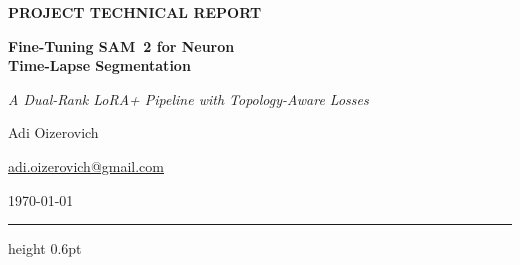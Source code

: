 \documentclass[11pt,a4paper]{article}
\begin{document}
\begin{center}
    {\small\sffamily\bfseries\color{accent}\MakeUppercase{Project Technical Report}\par}
    \vspace{0.9em}
    {\LARGE\bfseries Fine-Tuning SAM~2 for Neuron\\[2pt]
     Time-Lapse Segmentation\par}
    \vspace{0.55em}
    {\large\itshape A Dual-Rank LoRA+ Pipeline with Topology-Aware Losses\par}
    \vspace{1.1em}
    {\large Adi Oizerovich\par}
    \vspace{0.25em}
    {\small\href{mailto:adi.oizerovich@gmail.com}{adi.oizerovich@gmail.com}\par}
    \vspace{0.25em}
    {\small\today\par}
\end{center}
\vspace{0.3em}
{\color{rulegray}\hrule height 0.6pt}
\vspace{1.2em}
\thispagestyle{plain}
\end{document}

